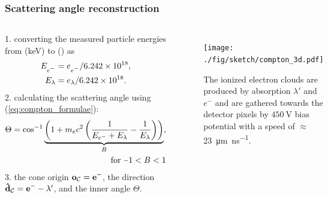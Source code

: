 \documentclass[aspectratio=169]{beamer}
\newcommand{\minus}{\scalebox{0.75}[1.0]{$-$}}
\begin{document}
\begin{frame}
\frametitle{Scattering angle reconstruction}

  \begin{columns}[c]


  1. converting the measured particle energies from (\si{\kilo\electronvolt}) to (\si{\joul}) as
  \begin{align*}
    E_{e^{\minus}} &= e_{e^{\minus}}/6.242\times10^{18},\\
    E_{\lambda} &= e_{\lambda}/6.242\times10^{18}.
  \end{align*}
  2. calculating the scattering angle using (\ref{eq:compton_formulae}):
  \begin{align*}
    \Theta = \cos^{-1} \underbrace{\left(1 + m_e c^2 \left(\frac{1}{E_{e^{-}} + E_\lambda} - \frac{1}{E_\lambda}\right)\right)}_{B},\\\text{for}\ \minus 1 < B < 1
  \end{align*}
  3. the cone origin $\mathbf{o}_{\mathcal{C}} = \mathbf{e}^{\minus}$, the direction $\mathbf{\hat{d}}_\mathcal{C} = \mathbf{e}^{\minus} - \lambda'$, and the inner angle $\Theta$.



  \begin{figure}
    \centering
    \texttt{[image: ./fig/sketch/compton\_3d.pdf]}
    \caption{
      The ionized electron clouds are produced by absorption $\lambda'$ and $e^-$ and are gathered towards the detector pixels by $\SI{450}{\volt}$ bias potential with a speed of $\approx$\,\SI{23}{\micro\meter\per\nano\second}.
    }
  \end{figure}


  \end{columns}

\end{frame}




\end{document}
